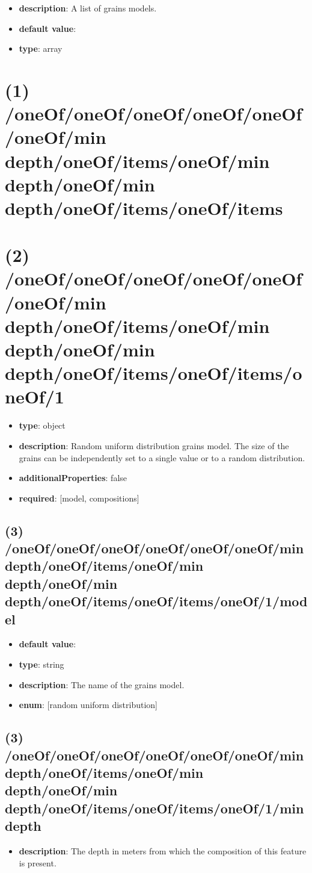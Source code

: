 \begin{itemize}[leftmargin=0em]\item {\bf description}: A list of grains models.
\item {\bf default value}: 
\item {\bf type}: array
\end{itemize}\section{(1) /oneOf/oneOf/oneOf/oneOf/oneOf/oneOf/min depth/oneOf/items/oneOf/min depth/oneOf/min depth/oneOf/items/oneOf/items}

\section{(2) /oneOf/oneOf/oneOf/oneOf/oneOf/oneOf/min depth/oneOf/items/oneOf/min depth/oneOf/min depth/oneOf/items/oneOf/items/oneOf/1}
\begin{itemize}[leftmargin=2em]\item {\bf type}: object
\item {\bf description}: Random uniform distribution grains model. The size of the grains can be independently set to a single value or to a random distribution.
\item {\bf additionalProperties}: false
\item {\bf required}: [model, compositions]\end{itemize}
\subsection{(3) /oneOf/oneOf/oneOf/oneOf/oneOf/oneOf/min depth/oneOf/items/oneOf/min depth/oneOf/min depth/oneOf/items/oneOf/items/oneOf/1/model}
\begin{itemize}[leftmargin=3em]\item {\bf default value}: 
\item {\bf type}: string
\item {\bf description}: The name of the grains model.
\item {\bf enum}: [random uniform distribution]\end{itemize}\subsection{(3) /oneOf/oneOf/oneOf/oneOf/oneOf/oneOf/min depth/oneOf/items/oneOf/min depth/oneOf/min depth/oneOf/items/oneOf/items/oneOf/1/min depth}
\begin{itemize}[leftmargin=3em]\item {\bf description}: The depth in meters from which the composition of this feature is present.
\end{itemize}
